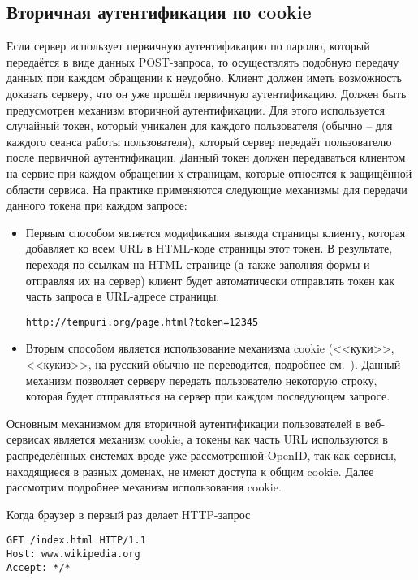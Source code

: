 \subsection{Вторичная аутентификация по cookie}

Если сервер использует первичную аутентификацию по паролю, который передаётся в виде данных POST-запроса, то осуществлять подобную передачу данных при каждом обращении к неудобно. Клиент должен иметь возможность доказать серверу, что он уже прошёл первичную аутентификацию. Должен быть предусмотрен механизм вторичной аутентификации. Для этого используется случайный токен, который уникален для каждого пользователя (обычно -- для каждого сеанса работы пользователя), который сервер передаёт пользователю после первичной аутентификации. Данный токен должен передаваться клиентом на сервис при каждом обращении к страницам, которые относятся к защищённой области сервиса. На практике применяются следующие механизмы для передачи данного токена при каждом запросе:

\begin{itemize}
	\item Первым способом является модификация вывода страницы клиенту, которая добавляет ко всем URL в HTML-коде страницы этот токен. В результате, переходя по ссылкам на HTML-странице (а также заполняя формы и отправляя их на сервер) клиент будет автоматически отправлять токен как часть запроса в URL-адресе страницы:

\texttt{http://tempuri.org/page.html?token=12345}
	\item Вторым способом является использование механизма cookie (<<куки>>, <<кукиз>>, на русский обычно не переводится, подробнее см.~\cite[Client Identification and Cookies]{Totty:2002}). Данный механизм позволяет серверу передать пользователю некоторую строку, которая будет отправляться на сервер при каждом последующем запросе.
\end{itemize}

Основным механизмом для вторичной аутентификации пользователей в веб-сервисах является механизм cookie, а токены как часть URL используются в распределённых системах вроде уже рассмотренной OpenID, так как сервисы, находящиеся в разных доменах, не имеют доступа к общим cookie. Далее рассмотрим подробнее механизм использования cookie.

Когда браузер в первый раз делает HTTP-запрос
\begin{center} \begin{verbatim}
GET /index.html HTTP/1.1
Host: www.wikipedia.org
Accept: */*
\end{verbatim} \end{center}

